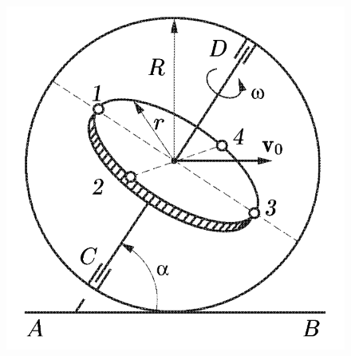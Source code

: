 \begin{figure}
  \begin{center}
        \vspace{-14 mm}
        \includegraphics[width=0.8\linewidth]{img/4_12.png}
  \end{center}
\end{figure}


